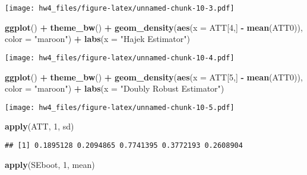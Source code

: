 \documentclass[]{article}
\newenvironment{Shaded}{\begin{snugshade}}{\end{snugshade}}
\newcommand{\KeywordTok}[1]{\textcolor[rgb]{0.13,0.29,0.53}{\textbf{#1}}}
\newcommand{\DataTypeTok}[1]{\textcolor[rgb]{0.13,0.29,0.53}{#1}}
\newcommand{\DecValTok}[1]{\textcolor[rgb]{0.00,0.00,0.81}{#1}}
\newcommand{\StringTok}[1]{\textcolor[rgb]{0.31,0.60,0.02}{#1}}
\newcommand{\OperatorTok}[1]{\textcolor[rgb]{0.81,0.36,0.00}{\textbf{#1}}}
\newcommand{\NormalTok}[1]{#1}
\begin{document}
\texttt{[image: hw4\_files/figure-latex/unnamed-chunk-10-3.pdf]}

\begin{Shaded}
\begin{Highlighting}[]
\KeywordTok{ggplot}\NormalTok{() }\OperatorTok{+}\StringTok{ }\KeywordTok{theme_bw}\NormalTok{() }\OperatorTok{+}
\StringTok{  }\KeywordTok{geom_density}\NormalTok{(}\KeywordTok{aes}\NormalTok{(}\DataTypeTok{x =}\NormalTok{ ATT[}\DecValTok{4}\NormalTok{,] }\OperatorTok{-}\StringTok{ }\KeywordTok{mean}\NormalTok{(ATT0)), }\DataTypeTok{color =} \StringTok{"maroon"}\NormalTok{) }\OperatorTok{+}\StringTok{ }\KeywordTok{labs}\NormalTok{(}\DataTypeTok{x =} \StringTok{"Hajek Estimator"}\NormalTok{)}
\end{Highlighting}
\end{Shaded}

\texttt{[image: hw4\_files/figure-latex/unnamed-chunk-10-4.pdf]}

\begin{Shaded}
\begin{Highlighting}[]
\KeywordTok{ggplot}\NormalTok{() }\OperatorTok{+}\StringTok{ }\KeywordTok{theme_bw}\NormalTok{() }\OperatorTok{+}
\StringTok{  }\KeywordTok{geom_density}\NormalTok{(}\KeywordTok{aes}\NormalTok{(}\DataTypeTok{x =}\NormalTok{ ATT[}\DecValTok{5}\NormalTok{,] }\OperatorTok{-}\StringTok{ }\KeywordTok{mean}\NormalTok{(ATT0)), }\DataTypeTok{color =} \StringTok{"maroon"}\NormalTok{) }\OperatorTok{+}\StringTok{ }\KeywordTok{labs}\NormalTok{(}\DataTypeTok{x =} \StringTok{"Doubly Robust Estimator"}\NormalTok{)}
\end{Highlighting}
\end{Shaded}

\texttt{[image: hw4\_files/figure-latex/unnamed-chunk-10-5.pdf]}

\begin{Shaded}
\begin{Highlighting}[]
\KeywordTok{apply}\NormalTok{(ATT, }\DecValTok{1}\NormalTok{, sd)}
\end{Highlighting}
\end{Shaded}

\begin{verbatim}
## [1] 0.1895128 0.2094865 0.7741395 0.3772193 0.2608904
\end{verbatim}

\begin{Shaded}
\begin{Highlighting}[]
\KeywordTok{apply}\NormalTok{(SEboot, }\DecValTok{1}\NormalTok{, mean)}
\end{Highlighting}
\end{Shaded}
\end{document}
